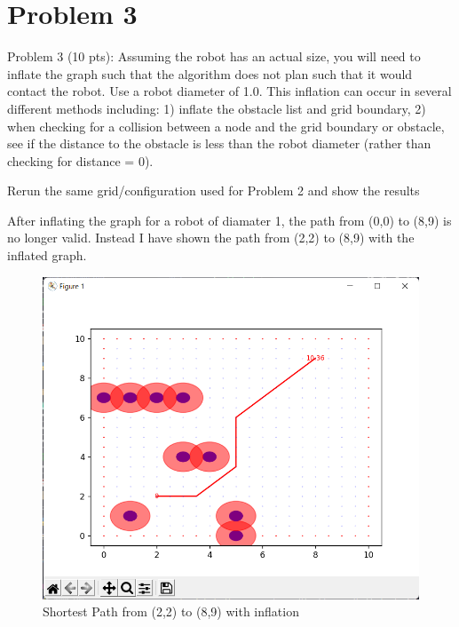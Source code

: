 \documentclass{article}
\begin{document}
\section*{Problem 3}

Problem 3 (10 pts):
Assuming the robot has an actual size, you will need to inflate the graph such that the algorithm does 
not plan such that it would contact the robot. Use a robot diameter of 1.0. This inflation can occur in 
several different methods including: 1) inflate the obstacle list and grid boundary, 2) when checking 
for a collision between a node and the grid boundary or obstacle, see if the distance to the obstacle is 
less than the robot diameter (rather than checking for distance = 0).

\bigskip
\noindent Rerun the same grid/configuration used for Problem 2 and show the results


\bigskip
After inflating the graph for a robot of diamater 1, the path from (0,0) to (8,9) is no longer valid.
Instead I have shown the path from (2,2) to (8,9) with the inflated graph.

\begin{figure}[h]
    \centering
    \includegraphics[width=12cm]{question3.png}
    \caption*{Shortest Path from (2,2) to (8,9) with inflation}
\end{figure}
\end{document}
